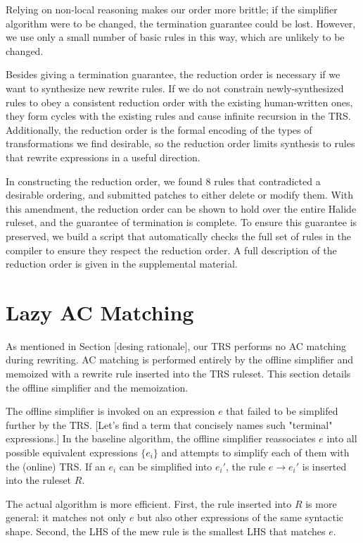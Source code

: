 \documentclass[acmsmall,review]{acmart}\settopmatter{printfolios=true,printccs=false,printacmref=false}
\begin{document}
Relying on non-local reasoning makes our order more brittle; if the simplifier algorithm were to be changed, the termination guarantee could be lost. However, we use only a small number of basic rules in this way, which are unlikely to be changed.

Besides giving a termination guarantee, the reduction order is necessary if we want to synthesize new rewrite rules. If we do not constrain newly-synthesized rules to obey a consistent reduction order with the existing human-written ones, they form cycles with the existing rules and cause infinite recursion in the TRS. Additionally, the reduction order is the formal encoding of the types of transformations we find desirable, so the reduction order limits synthesis to rules that rewrite expressions in a useful direction.

In constructing the reduction order, we found 8 rules that contradicted a desirable ordering, and submitted patches to either delete or modify them. With this amendment, the reduction order can be shown to hold over the entire Halide ruleset, and the guarantee of termination is complete. To ensure this guarantee is preserved, we build a script that automatically checks the full set of rules in the compiler to ensure they respect the reduction order. A full description of the reduction order is given in the supplemental material.

\section{Lazy AC Matching}

As mentioned in Section [desing rationale], our TRS performs no AC matching during rewriting.  AC matching is performed entirely by the offline simplifier and memoized with a rewrite rule inserted into the TRS ruleset.  This section details the offline simplifier and the memoization. 

The offline simplifier is invoked on an expression $e$ that failed to be simplifed further by the TRS. [Let's find a term that concisely names such "terminal" expressions.]  In the baseline algorithm, the offline simplifier reassociates $e$ into all possible equivalent expressions $\{ e_i \}$ and attempts to simplify each of them with the (online) TRS.  If an $e_i$ can be simplified into $e_i'$, the rule $e\rightarrow e_i'$ is inserted into the ruleset $R$. 

The actual algorithm is more efficient.  First, the rule inserted into $R$ is more general: it matches not only $e$ but also other expressions of the same syntactic shape. Second, the LHS of the mew rule is the smallest LHS that matches $e$. 
\end{document}
